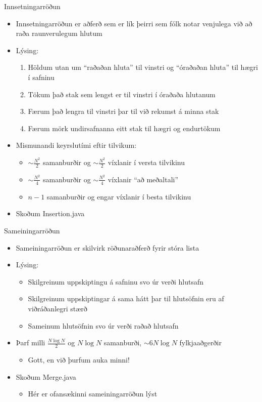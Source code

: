 \documentclass[handout]{beamer}
\begin{document}
\begin{frame}{Innsetningarröðun}
\begin{itemize}
 \item Innsetningarröðun  er aðferð sem er lík þeirri sem fólk notar venjulega við að raða raunverulegum hlutum
 \item Lýsing:
 \begin{enumerate}
  \item Höldum utan um ``raðaðan hluta'' til vinstri og ``óraðaðan hluta'' til hægri í safninu
  \item Tökum það stak sem lengst er til vinstri í óraðaða hlutanum
  \item Færum það lengra til vinstri þar til við rekumst á minna stak
  \item Færum mörk undirsafnanna eitt stak til hægri og endurtökum
 \end{enumerate}
 \item Mismunandi keyrslutími eftir tilvikum:
 \begin{itemize}
  \item $\sim \frac{N^2}{2}$ samanburðir og $\sim \frac{N^2}{2}$ víxlanir í versta tilvikinu
  \item $\sim \frac{N^2}{4}$ samanburðir og $\sim \frac{N^2}{4}$ víxlanir ``að meðaltali''
  \item $n-1$ samanburðir og engar víxlanir í besta tilvikinu 
 \end{itemize}
 \item Skoðum Insertion.java
\end{itemize}
\end{frame}

\begin{frame}{Sameiningarröðun}
\begin{itemize}
 \item Sameiningarröðun  er skilvirk röðunaraðferð fyrir stóra lista
 \item Lýsing:
 \begin{itemize}
  \item Skilgreinum uppskiptingu á safninu svo úr verði hlutsafn
  \item Skilgreinum uppskiptingar á sama hátt þar til hlutsöfnin eru af viðráðanlegri stærð
  \item Sameinum hlutsöfnin svo úr verði raðað hlutsafn
 \end{itemize}
 \item Þarf milli $\frac{N \log N}{2}$ og $N \log N$ samanburði, $\sim 6N\log N$ fylkjaaðgerðir
 \begin{itemize}
  \item Gott, en við þurfum auka minni!
 \end{itemize}
 \item Skoðum Merge.java
 \begin{itemize}
  \item Hér er ofansækinni  sameiningarröðun lýst
 \end{itemize}
\end{itemize}
\end{frame}
\end{document}
